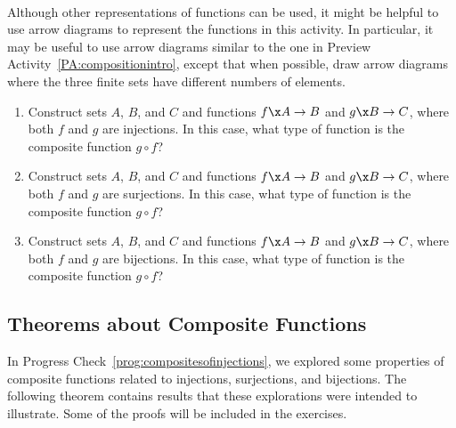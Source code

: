 \begin{prog} \label{prog:compositesofinjections} \hfill \\
Although other representations of functions can be used, it might be helpful to use arrow diagrams to represent the functions in this activity.  In particular, it may be useful to use arrow diagrams similar to the one in Preview Activity~\ref{PA:compositionintro}, except that when possible, draw arrow diagrams where the three finite sets have different numbers of elements.

\begin{enumerate}
\item Construct sets $A$, $B$, and $C$ and functions $f\x A \to B$ and $g\x B \to C$, where both $f$ and $g$ are injections.  In this case, what type of function is the composite function 
$g \circ f$?

\item Construct sets $A$, $B$, and $C$ and functions $f\x A \to B$ and $g\x B \to C$, where both $f$ and $g$ are surjections.  In this case, what type of function is the composite function 
$g \circ f$?

\item Construct sets $A$, $B$, and $C$ and functions $f\x A \to B$ and $g\x B \to C$, where both $f$ and $g$ are bijections.  In this case, what type of function is the composite function $g \circ f$?
\end{enumerate}
\end{prog}
\hbreak
%
\subsection*{Theorems about Composite Functions}
In Progress Check~\ref{prog:compositesofinjections}, we explored some properties of composite functions related to injections, surjections, and bijections.  The following theorem contains results that these explorations were intended to illustrate.  Some of the proofs will be included in the exercises.

